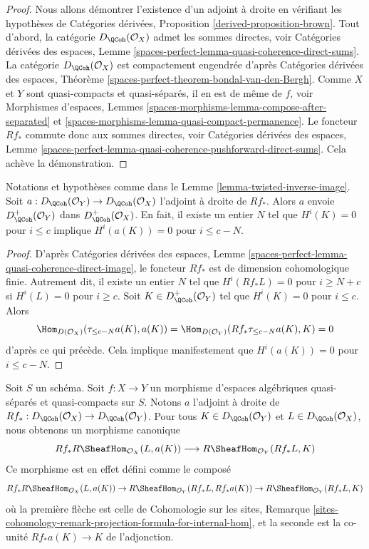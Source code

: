 \begin{proof}
Nous allons démontrer l'existence d'un adjoint à droite en vérifiant les hypothèses de
Catégories dérivées, Proposition \ref{derived-proposition-brown}.
Tout d'abord, la catégorie $D_\QCoh(\mathcal{O}_X)$ admet les sommes directes, voir
Catégories dérivées des espaces, Lemme
\ref{spaces-perfect-lemma-quasi-coherence-direct-sums}.
La catégorie $D_\QCoh(\mathcal{O}_X)$ est compactement engendrée d'après
Catégories dérivées des espaces, Théorème
\ref{spaces-perfect-theorem-bondal-van-den-Bergh}.
Comme $X$ et $Y$ sont quasi-compacts et quasi-séparés, il en est de même de $f$, voir
Morphismes d'espaces, Lemmes
\ref{spaces-morphisms-lemma-compose-after-separated} et
\ref{spaces-morphisms-lemma-quasi-compact-permanence}.
Le foncteur $Rf_*$ commute donc aux sommes directes, voir
Catégories dérivées des espaces, Lemme
\ref{spaces-perfect-lemma-quasi-coherence-pushforward-direct-sums}.
Cela achève la démonstration.
\end{proof}

\begin{lemma}
\label{lemma-twisted-inverse-image-bounded-below}
Notations et hypothèses comme dans le Lemme \ref{lemma-twisted-inverse-image}.
Soit $a : D_\QCoh(\mathcal{O}_Y) \to D_\QCoh(\mathcal{O}_X)$ l'adjoint à droite
de $Rf_*$. Alors $a$ envoie
$D^+_\QCoh(\mathcal{O}_Y)$ dans $D^+_\QCoh(\mathcal{O}_X)$.
En fait, il existe un entier $N$ tel que
$H^i(K) = 0$ pour $i \leq c$ implique $H^i(a(K)) = 0$ pour $i \leq c - N$.
\end{lemma}

\begin{proof}
D'après Catégories dérivées des espaces, Lemme
\ref{spaces-perfect-lemma-quasi-coherence-direct-image},
le foncteur $Rf_*$ est de dimension cohomologique finie. Autrement dit,
il existe un entier $N$ tel que
$H^i(Rf_*L) = 0$ pour $i \geq N + c$ si $H^i(L) = 0$ pour $i \geq c$.
Soit $K \in D^+_\QCoh(\mathcal{O}_Y)$ tel que $H^i(K) = 0$ pour $i \leq c$.
Alors
$$
\Hom_{D(\mathcal{O}_X)}(\tau_{\leq c - N}a(K), a(K)) =
\Hom_{D(\mathcal{O}_Y)}(Rf_*\tau_{\leq c - N}a(K), K) = 0
$$
d'après ce qui précède. Cela implique manifestement que
$H^i(a(K)) = 0$ pour $i \leq c - N$.
\end{proof}

\noindent
Soit $S$ un schéma.
Soit $f : X \to Y$ un morphisme d'espaces algébriques quasi-séparés et quasi-compacts
sur $S$.
Notons $a$ l'adjoint à droite de
$Rf_* : D_\QCoh(\mathcal{O}_X) \to D_\QCoh(\mathcal{O}_Y)$. Pour tous
$K \in D_\QCoh(\mathcal{O}_Y)$ et $L \in D_\QCoh(\mathcal{O}_X)$,
nous obtenons un morphisme canonique
\begin{equation}
\label{equation-sheafy-trace}
Rf_*R\SheafHom_{\mathcal{O}_X}(L, a(K))
\longrightarrow
R\SheafHom_{\mathcal{O}_Y}(Rf_*L, K)
\end{equation}
Ce morphisme est en effet défini comme le composé
$$
Rf_*R\SheafHom_{\mathcal{O}_X}(L, a(K)) \to
R\SheafHom_{\mathcal{O}_Y}(Rf_*L, Rf_*a(K)) \to
R\SheafHom_{\mathcal{O}_Y}(Rf_*L, K)
$$
où la première flèche est celle de
Cohomologie sur les sites, Remarque
\ref{sites-cohomology-remark-projection-formula-for-internal-hom},
et la seconde est la co-unité $Rf_*a(K) \to K$ de l'adjonction.

